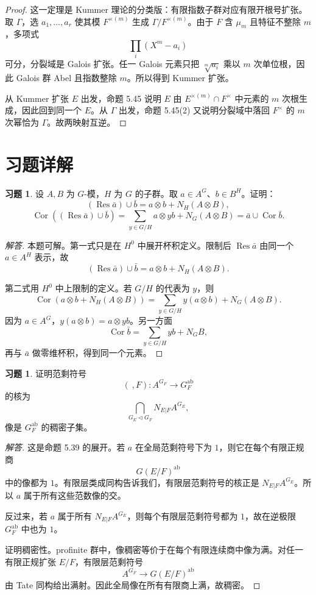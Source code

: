 \documentclass[11pt,a4paper,openany]{ctexbook}
\numberwithin{equation}{chapter}
\theoremstyle{plain}
\theoremstyle{definition}
\newtheorem{exercise}[theorem]{习题}
\theoremstyle{remark}
\begin{document}
\begin{proof}
这一定理是 Kummer 理论的分类版：有限指数子群对应有限开根号扩张。
取 $\Gamma$，选 $a_1,\ldots,a_r$ 使其模 $F^{\times(m)}$ 生成 $\Gamma/F^{\times(m)}$。由于 $F$ 含 $\mu_m$ 且特征不整除 $m$，多项式
\[
 \prod_i(X^m-a_i)
\]
可分，分裂域是 Galois 扩张。任一 Galois 元素只把 $\sqrt[m]{a_i}$ 乘以 $m$ 次单位根，因此 Galois 群 Abel 且指数整除 $m$。所以得到 Kummer 扩张。

从 Kummer 扩张 $E$ 出发，命题 5.45 说明 $E$ 由 $E^{\times(m)}\cap F^\times$ 中元素的 $m$ 次根生成，因此回到同一个 $E$。从 $\Gamma$ 出发，命题 5.45(2) 又说明分裂域中落回 $F^\times$ 的 $m$ 次幂恰为 $\Gamma$。故两映射互逆。
\end{proof}

\section*{习题详解}

\begin{exercise}
设 $A,B$ 为 $G$-模，$H$ 为 $G$ 的子群。取 $a\in A^G$、$b\in B^H$。证明：
\[
 (\operatorname{Res}\bar a)\cup\bar b
 =a\otimes b+N_H(A\otimes B),
\]
\[
 \operatorname{Cor}((\operatorname{Res}\bar a)\cup\bar b)
 =
 \sum_{y\in G/H}a\otimes yb+N_G(A\otimes B)
 =
 \bar a\cup\operatorname{Cor}\bar b.
\]
\end{exercise}

\begin{proof}[解答]
本题可解。第一式只是在 $H^0$ 中展开杯积定义。限制后 $\operatorname{Res}\bar a$ 由同一个 $a\in A^H$ 表示，故
\[
 (\operatorname{Res}\bar a)\cup\bar b
 =a\otimes b+N_H(A\otimes B).
\]

第二式用 $H^0$ 中上限制的定义。若 $G/H$ 的代表为 $y$，则
\[
 \operatorname{Cor}(a\otimes b+N_H(A\otimes B))
 =
 \sum_{y\in G/H}y(a\otimes b)+N_G(A\otimes B).
\]
因为 $a\in A^G$，$y(a\otimes b)=a\otimes yb$。另一方面
\[
 \operatorname{Cor}\bar b=\sum_{y\in G/H}yb+N_GB,
\]
再与 $\bar a$ 做零维杯积，得到同一个元素。
\end{proof}

\begin{exercise}
证明范剩符号
\[
 (\ ,F):A^{G_F}\to G_F^{\operatorname{ab}}
\]
的核为
\[
 \bigcap_{G_E\triangleleft G_F}N_{E|F}A^{G_E},
\]
像是 $G_F^{\operatorname{ab}}$ 的稠密子集。
\end{exercise}

\begin{proof}[解答]
这是命题 5.39 的展开。若 $a$ 在全局范剩符号下为 $1$，则它在每个有限正规商
\[
 G(E/F)^{\operatorname{ab}}
\]
中的像都为 $1$。有限层类成同构告诉我们，有限层范剩符号的核正是 $N_{E|F}A^{G_E}$。所以 $a$ 属于所有这些范数像的交。

反过来，若 $a$ 属于所有 $N_{E|F}A^{G_E}$，则每个有限层范剩符号都为 $1$，故在逆极限 $G_F^{\operatorname{ab}}$ 中也为 $1$。

证明稠密性。profinite 群中，像稠密等价于在每个有限连续商中像为满。对任一有限正规扩张 $E/F$，有限层范剩符号
\[
 A^{G_F}\to G(E/F)^{\operatorname{ab}}
\]
由 Tate 同构给出满射。因此全局像在所有有限商上满，故稠密。
\end{proof}
\end{document}
